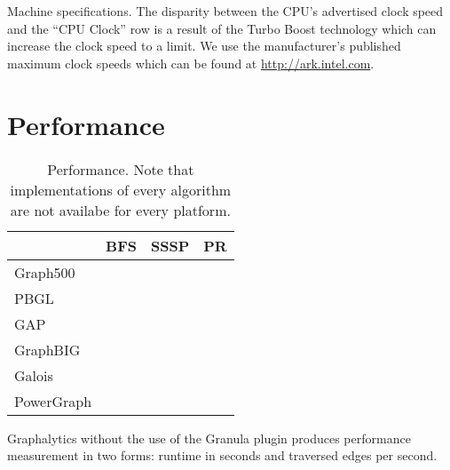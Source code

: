 \documentclass[conference]{IEEEtran}
\begin{document}
\begin{table}[!htb]
	\centering
	\caption{Machine specifications. The disparity between the CPU's advertised clock speed and the ``CPU Clock'' row is a result of the Turbo Boost technology which can increase the clock speed to a limit. We use the manufacturer's published maximum clock speeds which can be found at \url{http://ark.intel.com}.}
	\label{tab:specs}
\end{table}

\section{Performance}

\begin{table}[htb]
	\centering
	\begin{tabular}{l|c|c|c}
		& BFS & SSSP & PR \\ \hline
		Graph500 & & & \\ \hline
		PBGL  & & & \\ \hline
		GAP  & & & \\ \hline
		GraphBIG  & & & \\ \hline
		Galois  & & & \\ \hline
		PowerGraph  & & &
	\end{tabular}
	\caption{Performance. Note that implementations of every algorithm are not availabe for every platform.}
	\label{tab:reportcard}
\end{table}


Graphalytics without the use of the Granula plugin produces performance measurement in two forms: runtime in seconds and traversed edges per second.

\end{document}
